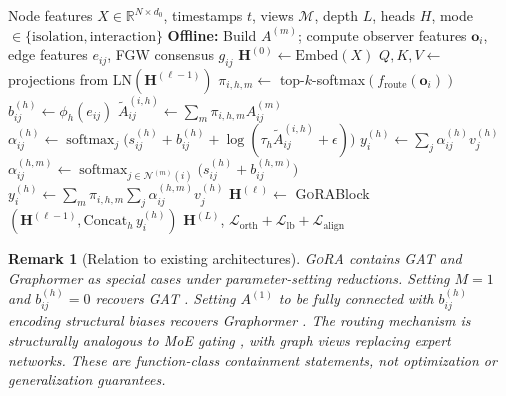 \documentclass[11pt,a4paper]{article}
\newtheorem{remark}{Remark}
\newcommand{\ours}{\textsc{GoRA}}  %
\newcommand{\RR}{\mathbb{R}}
\newcommand{\calM}{\mathcal{M}}
\newcommand{\calN}{\mathcal{N}}
\newcommand{\calL}{\mathcal{L}}
\DeclareMathOperator{\softmax}{softmax}
\begin{document}
\begin{algorithm}[t]
\caption{\ours{} Forward Pass}
\label{alg:forward}
\begin{algorithmic}[1]
\Require Node features $X \in \RR^{N \times d_0}$, timestamps $t$,
  views $\calM$, depth $L$, heads $H$, mode $\in \{\text{isolation},
  \text{interaction}\}$
\State \textbf{Offline:} Build $A^{(m)}$; compute observer features
  $\mathbf{o}_i$, edge features $e_{ij}$, FGW consensus $g_{ij}$
\State $\mathbf{H}^{(0)} \gets \mathrm{Embed}(X)$
  \State $Q, K, V \gets$ projections from $\mathrm{LN}(\mathbf{H}^{(\ell-1)})$
  \State $\pi_{i,h,m} \gets$ top-$k$-softmax$(f_{\mathrm{route}}(\mathbf{o}_i))$
    \hfill{}
  \State $b_{ij}^{(h)} \gets \phi_h(e_{ij})$
    \hfill{}
    \State $\tilde{A}_{ij}^{(i,h)} \gets \sum_m \pi_{i,h,m} A_{ij}^{(m)}$
    \State $\alpha_{ij}^{(h)} \gets \softmax_j\!\big(
      s_{ij}^{(h)} + b_{ij}^{(h)} + \log(\tau_h \tilde{A}_{ij}^{(i,h)}
      + \epsilon)\big)$
    \State $y_i^{(h)} \gets \sum_j \alpha_{ij}^{(h)} v_j^{(h)}$
  \Else \hfill{}
      \State $\alpha_{ij}^{(h,m)} \gets \softmax_{j \in \calN^{(m)}(i)}
        \!\big(s_{ij}^{(h)} + b_{ij}^{(h,m)}\big)$
    \EndFor
    \State $y_i^{(h)} \gets \sum_m \pi_{i,h,m} \sum_j
      \alpha_{ij}^{(h,m)} v_j^{(h)}$
  \EndIf
  \State $\mathbf{H}^{(\ell)} \gets$ \ours{}Block$(\mathbf{H}^{(\ell-1)},
    \mathrm{Concat}_h\, y_i^{(h)})$
    \hfill{}
\EndFor
\State \Return $\mathbf{H}^{(L)}$,
  $\calL_{\mathrm{orth}} + \calL_{\mathrm{lb}} + \calL_{\mathrm{align}}$
\end{algorithmic}
\end{algorithm}

\begin{remark}[Relation to existing architectures]
  \label{rem:subsumption}
  \ours{} contains GAT and Graphormer as special cases under
  parameter-setting reductions.
  Setting $M=1$ and $b_{ij}^{(h)} = 0$ recovers GAT
  \citep{velickovic2018graph}.
  Setting $A^{(1)}$ to be fully connected with $b_{ij}^{(h)}$
  encoding structural biases recovers Graphormer
  \citep{ying2021transformers}.
  The routing mechanism is structurally analogous to MoE gating
  \citep{shazeer2017outrageously}, with graph views replacing expert
  networks.
  These are function-class containment statements, not optimization
  or generalization guarantees.
\end{remark}
\end{document}
